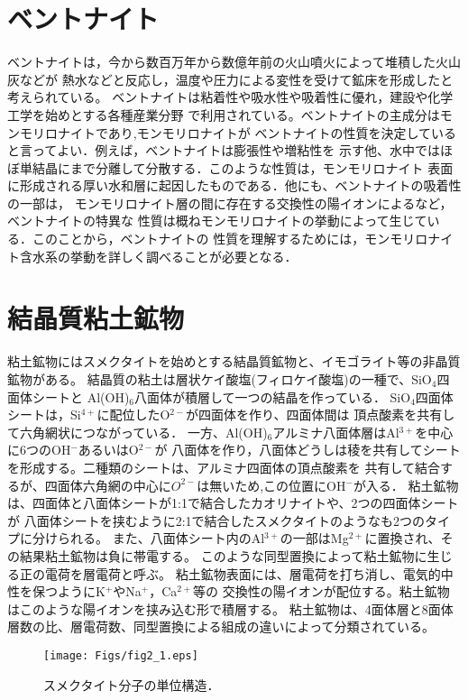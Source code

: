 ﻿\section{ベントナイト}
ベントナイトは，今から数百万年から数億年前の火山噴火によって堆積した火山灰などが
熱水などと反応し，温度や圧力による変性を受けて鉱床を形成したと考えられている。
ベントナイトは粘着性や吸水性や吸着性に優れ，建設や化学工学を始めとする各種産業分野
で利用されている。ベントナイトの主成分はモンモリロナイトであり,モンモリロナイトが
ベントナイトの性質を決定していると言ってよい．例えば，ベントナイトは膨張性や増粘性を
示す他、水中ではほぼ単結晶にまで分離して分散する．このような性質は，モンモリロナイト
表面に形成される厚い水和層に起因したものである．他にも、ベントナイトの吸着性の一部は，
モンモリロナイト層の間に存在する交換性の陽イオンによるなど，ベントナイトの特異な
性質は概ねモンモリロナイトの挙動によって生じている．このことから，ベントナイトの
性質を理解するためには，モンモリロナイト含水系の挙動を詳しく調べることが必要となる．
\section{結晶質粘土鉱物}
粘土鉱物にはスメクタイトを始めとする結晶質鉱物と、イモゴライト等の非晶質鉱物がある。
結晶質の粘土は層状ケイ酸塩(フィロケイ酸塩)の一種で、SiO$_4$四面体シートと
Al(OH)$_6$八面体が積層して一つの結晶を作っている．
SiO$_4$四面体シートは，Si$^{4+}$に配位したO$^{2-}$が四面体を作り、四面体間は
頂点酸素を共有して六角網状につながっている．
一方、Al(OH)$_6$アルミナ八面体層はAl$^{3+}$を中心に6つのOH$^-$あるいはO$^{2-}$が
八面体を作り，八面体どうしは稜を共有してシートを形成する。二種類のシートは、アルミナ四面体の頂点酸素を
共有して結合するが、四面体六角網の中心に$O^{2-}$は無いため,この位置にOH$^-$が入る．
粘土鉱物は、四面体と八面体シートが1:1で結合したカオリナイトや、2つの四面体シートが
八面体シートを挟むように2:1で結合したスメクタイトのようなも2つのタイプに分けられる。
また、八面体シート内のAl$^{3+}$の一部はMg$^{2+}$に置換され、その結果粘土鉱物は負に帯電する。
このような同型置換によって粘土鉱物に生じる正の電荷を層電荷と呼ぶ。
粘土鉱物表面には、層電荷を打ち消し、電気的中性を保つようにK$^+$やNa$^+$，Ca$^{2+}$等の
交換性の陽イオンが配位する。粘土鉱物はこのような陽イオンを挟み込む形で積層する。
粘土鉱物は、4面体層と8面体層数の比、層電荷数、同型置換による組成の違いによって分類されている。
\begin{figure}[h]
	\begin{center}
	\texttt{[image: Figs/fig2\_1.eps]} 
	\end{center}
	\caption{
		スメクタイト分子の単位構造．
	} 
	\label{fig:fig2_1}
\end{figure}

